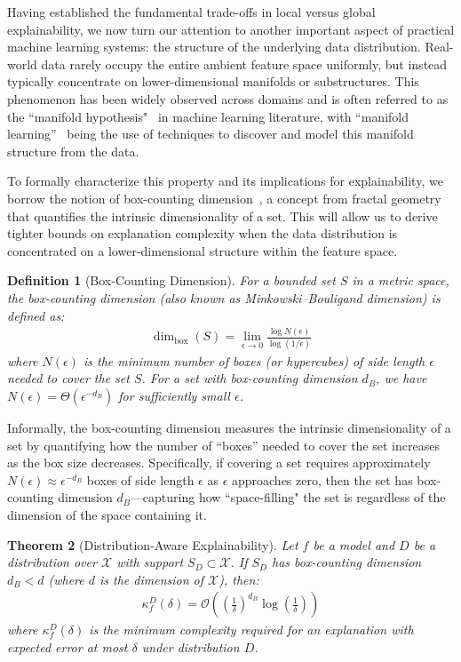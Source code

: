 \documentclass[11pt,letter,leqno]{article}
\newtheorem{theorem}{Theorem}[section]
\newtheorem{definition}[theorem]{Definition}
\begin{document}
Having established the fundamental trade-offs in local versus global explainability, we now turn our attention to another important aspect of practical machine learning systems: the structure of the underlying data distribution.  Real-world data rarely occupy the entire ambient feature space uniformly, but instead typically concentrate on lower-dimensional manifolds or substructures.  This phenomenon has been widely observed across domains and is often referred to as the ``manifold hypothesis"~\cite{Fefferman2016} in machine learning literature, with ``manifold learning''~\cite{Meila2024} being the use of techniques to discover and model this manifold structure from the data.

To formally characterize this property and its implications for explainability, we borrow the notion of box-counting dimension~\cite{Lapidus2024invitation}, a concept from fractal geometry~\cite{Falconer2003fractal} that quantifies the intrinsic dimensionality of a set.  This will allow us to derive tighter bounds on explanation complexity when the data distribution is concentrated on a lower-dimensional structure within the feature space.

\begin{definition}[Box-Counting Dimension]
For a bounded set $S$ in a metric space, the box-counting dimension (also known as Minkowski–Bouligand dimension) is defined as:
\begin{align}
\dim_{\text{box}}(S) = \lim_{\epsilon \to 0} \frac{\log N(\epsilon)}{\log(1/\epsilon)}
\end{align}
where $N(\epsilon)$ is the minimum number of boxes (or hypercubes) of side length $\epsilon$ needed to cover the set $S$.  For a set with box-counting dimension $d_B$, we have $N(\epsilon) = \Theta(\epsilon^{-d_B})$ for sufficiently small $\epsilon$.
\end{definition}

Informally, the box-counting dimension measures the intrinsic dimensionality of a set by quantifying how the number of ``boxes'' needed to cover the set increases as the box size decreases.  Specifically, if covering a set requires approximately $N(\epsilon) \approx \epsilon^{-d_B}$ boxes of side length $\epsilon$ as $\epsilon$ approaches zero, then the set has box-counting dimension $d_B$---capturing how ``space-filling" the set is regardless of the dimension of the space containing it.

\begin{theorem}[Distribution-Aware Explainability]
\label{thm:distribution-aware}
Let $f$ be a model and $D$ be a distribution over $\mathcal{X}$ with support $S_D \subset \mathcal{X}$.  If $S_D$ has box-counting dimension $d_B < d$ (where $d$ is the dimension of $\mathcal{X}$), then:
\begin{align}
\kappa_f^D(\delta) = \mathcal{O}\left(\left(\frac{1}{\delta}\right)^{d_B} \log\left(\frac{1}{\delta}\right)\right)
\end{align}
where $\kappa_f^D(\delta)$ is the minimum complexity required for an explanation with expected error at most $\delta$ under distribution $D$.
\end{theorem}
\end{document}
